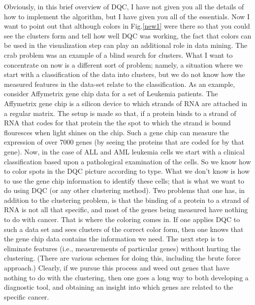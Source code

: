 \documentclass[fleqn,twoside]{article}
\begin{document}
Obviously, in this brief overview of DQC, I have not given you all
the details of how to implement the algorithm, but I have given you
all of the essentials.  Now I want to point out that although colors
in Fig.\ref{new1} were there so that you could see the clusters form
and tell how well DQC was working, the fact that colors can be used
in the visualization step can play an additional role in data
mining.  The crab problem was an example of a blind search for
clusters. What I want to concentrate on now is a different sort of
problem; namely, a situation where we start with a classification of
the data into clusters, but we do not know how the measured features
in the data-set relate to the classification.  As an example,
consider Affymetrix gene chip data for a set of Leukemia patients.
The Affymetrix gene chip is a silicon device to which strands of
RNA are attached in a regular matrix. The setup is made so that,
if a protein binds to a strand of RNA that codes for that protein
the the spot to which the strand is bound flouresces when light
shines on the chip.  Such a gene chip can measure
the expression of over 7000 genes (by seeing the proteins that
are coded for by that gene).  Now, in the case of ALL and AML
leukemia cells we start with a clinical classification based upon
a pathological examination of the cells.  So we know how to color
spots in the DQC picture according to type.  What we don't know
is how to use the gene chip information to identify these cells;
that is what we want to do using DQC (or any other clustering
method).  Two problems that one has, in addition to the clustering
problem, is that the binding of a protein to a strand of
RNA is not all that specific, and most of the genes being
measured have nothing to do with cancer.  That is where the
coloring comes in.  If one applies DQC to such a data set and
sees clusters of the correct color form, then one knows that
the gene chip data contains the information we need.  The next
step is to eliminate features (i.e., measurements of particular
genes) without hurting the clustering.  (There are various schemes
for doing this, including the brute force approach.)  Clearly,
if we pursue this process and weed out genes that have nothing to
do with the clustering, then one goes a long way to both developing
a diagnostic tool, and obtaining an insight into which genes are
related to the specific cancer.
\end{document}
